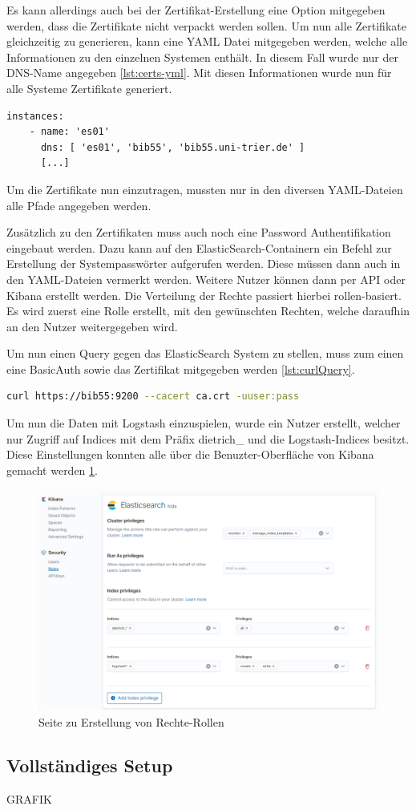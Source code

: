 Es kann allerdings auch bei der Zertifikat-Erstellung eine Option mitgegeben werden, dass die Zertifikate nicht verpackt werden sollen. Um nun alle Zertifikate gleichzeitig zu generieren, kann eine YAML Datei mitgegeben werden, welche alle Informationen zu den einzelnen Systemen enthält. In diesem Fall wurde nur der DNS-Name angegeben \ref{lst:certs-yml}. Mit diesen Informationen wurde nun für alle Systeme Zertifikate generiert. 

\begin{lstlisting}[language=XML, frame=single, label={lst:certs-yml}] 
	instances:
	- name: 'es01'
	  dns: [ 'es01', 'bib55', 'bib55.uni-trier.de' ]
	  [...]
\end{lstlisting}

Um die Zertifikate nun einzutragen, mussten nur in den diversen YAML-Dateien alle Pfade angegeben werden. 

Zusätzlich zu den Zertifikaten muss auch noch eine Password Authentifikation eingebaut werden. Dazu kann auf den ElasticSearch-Containern ein Befehl zur Erstellung der Systempasswörter aufgerufen werden. Diese müssen dann auch in den YAML-Dateien vermerkt werden. Weitere Nutzer können dann per API oder Kibana erstellt werden. Die Verteilung der Rechte passiert hierbei rollen-basiert. Es wird zuerst eine Rolle erstellt, mit den gewünschten Rechten, welche daraufhin an den Nutzer weitergegeben wird.

Um nun einen Query gegen das ElasticSearch System zu stellen, muss zum einen eine BasicAuth sowie das Zertifikat mitgegeben werden \ref{lst:curlQuery}.

\begin{lstlisting}[language=BASH, frame=single, label={lst:curlQuery}] 
	curl https://bib55:9200 --cacert ca.crt -uuser:pass
\end{lstlisting}

Um nun die Daten mit Logstash einzuspielen, wurde ein Nutzer erstellt, welcher nur Zugriff auf Indices mit dem Präfix dietrich\_ und die Logstash-Indices besitzt. Diese Einstellungen konnten alle über die Benuzter-Oberfläche von Kibana gemacht werden \ref{img:kibanaRoles}. 


\begin{figure}
	\centering
	\includegraphics[width=1\linewidth]{images/setup/kibana_roles.png}
	\caption{Seite zu Erstellung von Rechte-Rollen}
	\label{img:kibanaRoles}
\end{figure}

\subsection{Vollständiges Setup}

GRAFIK